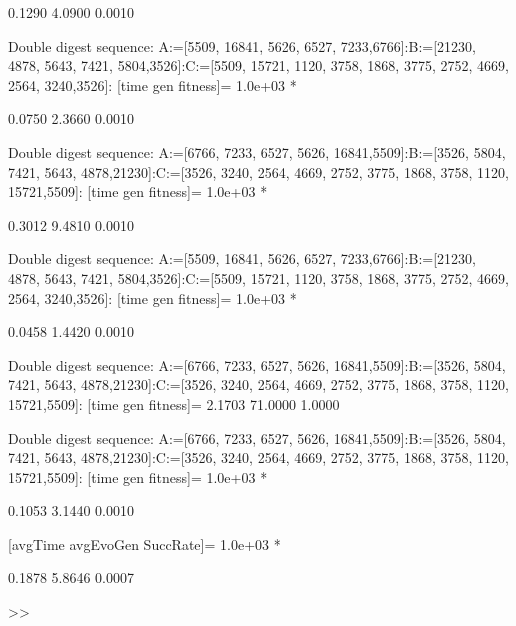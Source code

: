     0.1290    4.0900    0.0010

Double digest sequence:
A:=[5509, 16841, 5626, 6527, 7233,6766]:B:=[21230, 4878, 5643, 7421, 5804,3526]:C:=[5509, 15721, 1120, 3758, 1868, 3775, 2752, 4669, 2564, 3240,3526]:
[time gen fitness]=
   1.0e+03 *

    0.0750    2.3660    0.0010

Double digest sequence:
A:=[6766, 7233, 6527, 5626, 16841,5509]:B:=[3526, 5804, 7421, 5643, 4878,21230]:C:=[3526, 3240, 2564, 4669, 2752, 3775, 1868, 3758, 1120, 15721,5509]:
[time gen fitness]=
   1.0e+03 *

    0.3012    9.4810    0.0010

Double digest sequence:
A:=[5509, 16841, 5626, 6527, 7233,6766]:B:=[21230, 4878, 5643, 7421, 5804,3526]:C:=[5509, 15721, 1120, 3758, 1868, 3775, 2752, 4669, 2564, 3240,3526]:
[time gen fitness]=
   1.0e+03 *

    0.0458    1.4420    0.0010

Double digest sequence:
A:=[6766, 7233, 6527, 5626, 16841,5509]:B:=[3526, 5804, 7421, 5643, 4878,21230]:C:=[3526, 3240, 2564, 4669, 2752, 3775, 1868, 3758, 1120, 15721,5509]:
[time gen fitness]=
    2.1703   71.0000    1.0000

Double digest sequence:
A:=[6766, 7233, 6527, 5626, 16841,5509]:B:=[3526, 5804, 7421, 5643, 4878,21230]:C:=[3526, 3240, 2564, 4669, 2752, 3775, 1868, 3758, 1120, 15721,5509]:
[time gen fitness]=
   1.0e+03 *

    0.1053    3.1440    0.0010

[avgTime  avgEvoGen  SuccRate]=
   1.0e+03 *

    0.1878    5.8646    0.0007

>> 